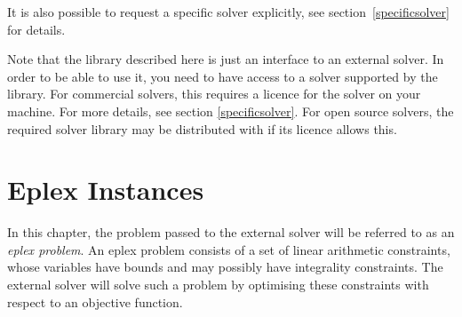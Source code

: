It is also possible to request a specific solver explicitly,
see section~\ref{specificsolver} for details.

Note that the {\eclipse} library described here is just an interface
to an external solver. In order to be able to use it, you need to have
access to a solver supported by the library. For commercial solvers, this
requires a licence for the solver on your machine. For more details,
see section \ref{specificsolver}. For open source solvers, the required
solver library may be distributed with {\eclipse} if its licence allows
this.


%
%
%
%


\section{Eplex Instances}

In this chapter, the problem passed to the external solver will be referred
to as an {\it eplex problem}. An eplex problem consists of a set of linear
arithmetic constraints, whose variables have bounds and may possibly have
integrality constraints. The external solver will solve such a problem by optimising
these constraints with respect to an objective function. 

